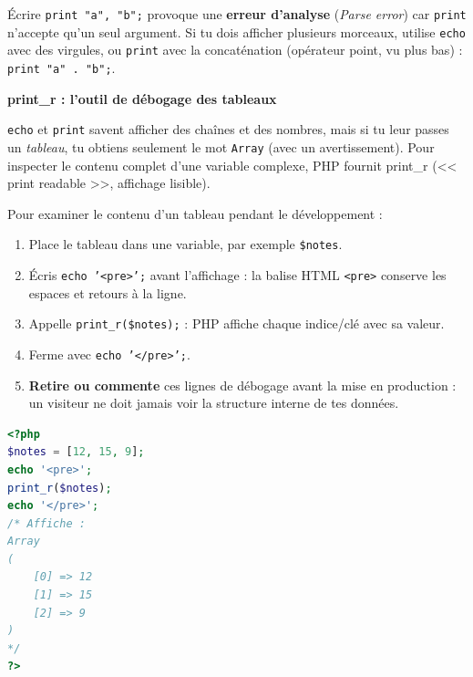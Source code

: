 \documentclass[11pt]{article}
\newcommand{\cle}[1]{{\popxbold\color{popdark}#1}}
\begin{document}
\begin{attention}
Écrire \texttt{print "a", "b";} provoque une \textbf{erreur d'analyse} (\emph{Parse error}) car \texttt{print} n'accepte qu'un seul argument. Si tu dois afficher plusieurs morceaux, utilise \texttt{echo} avec des virgules, ou \texttt{print} avec la concaténation (opérateur point, vu plus bas) : \texttt{print "a" . "b";}.
\end{attention}

\textbf{print\_r : l'outil de débogage des tableaux}\par

\texttt{echo} et \texttt{print} savent afficher des chaînes et des nombres, mais si tu leur passes un \emph{tableau}, tu obtiens seulement le mot \texttt{Array} (avec un avertissement). Pour inspecter le contenu complet d'une variable complexe, PHP fournit \cle{print\_r} (<< print readable >>, affichage lisible).

\begin{methode}
Pour examiner le contenu d'un tableau pendant le développement :
\begin{enumerate}
\item Place le tableau dans une variable, par exemple \texttt{\$notes}.
\item Écris \texttt{echo '<pre>';} avant l'affichage : la balise HTML \texttt{<pre>} conserve les espaces et retours à la ligne.
\item Appelle \texttt{print\_r(\$notes);} : PHP affiche chaque indice/clé avec sa valeur.
\item Ferme avec \texttt{echo '</pre>';}.
\item \textbf{Retire ou commente} ces lignes de débogage avant la mise en production : un visiteur ne doit jamais voir la structure interne de tes données.
\end{enumerate}
\end{methode}

\begin{exemplebox}
\begin{lstlisting}[language=Php]
<?php
$notes = [12, 15, 9];
echo '<pre>';
print_r($notes);
echo '</pre>';
/* Affiche :
Array
(
    [0] => 12
    [1] => 15
    [2] => 9
)
*/
?>
\end{lstlisting}
\end{exemplebox}
\end{document}
